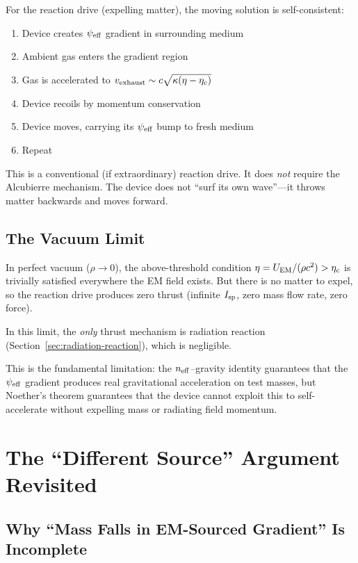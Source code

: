 \documentclass[11pt]{article}
\newcommand{\psieff}{\psi_{\rm eff}}
\newcommand{\neff}{n_{\rm eff}}
\newcommand{\etac}{\eta_c}
\begin{document}
For the reaction drive (expelling matter), the moving solution is
self-consistent:
\begin{enumerate}
\item Device creates $\psieff$ gradient in surrounding medium
\item Ambient gas enters the gradient region
\item Gas is accelerated to $v_{\rm exhaust} \sim c\sqrt{\kappa(\eta - \etac)}$
\item Device recoils by momentum conservation
\item Device moves, carrying its $\psieff$ bump to fresh medium
\item Repeat
\end{enumerate}

This is a conventional (if extraordinary) reaction drive. It does
\emph{not} require the Alcubierre mechanism. The device does not
``surf its own wave''---it throws matter backwards and moves forward.

\subsection{The Vacuum Limit}

In perfect vacuum ($\rho \to 0$), the above-threshold condition
$\eta = U_{\rm EM}/(\rho c^2) > \etac$ is trivially satisfied everywhere
the EM field exists. But there is no matter to expel, so the reaction
drive produces zero thrust (infinite $I_{\rm sp}$, zero mass flow rate,
zero force).

In this limit, the \emph{only} thrust mechanism is radiation reaction
(Section~\ref{sec:radiation-reaction}), which is negligible.

This is the fundamental limitation: the $\neff$--gravity identity
guarantees that the $\psieff$ gradient produces real gravitational
acceleration on test masses, but Noether's theorem guarantees that
the device cannot exploit this to self-accelerate without expelling
mass or radiating field momentum.

\section{The ``Different Source'' Argument Revisited}\label{sec:different-source}

\subsection{Why ``Mass Falls in EM-Sourced Gradient'' Is Incomplete}
\end{document}
